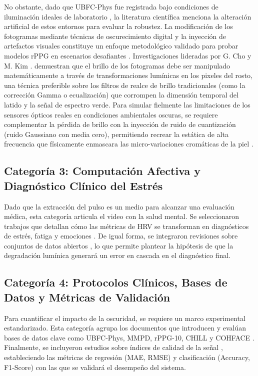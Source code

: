 No obstante, dado que UBFC-Phys fue registrada bajo condiciones de iluminación ideales de laboratorio \cite{debnath2026advanced_signal}, la literatura científica menciona la alteración 
artificial de estos entornos para evaluar la robustez. La modificación de los fotogramas mediante técnicas de oscurecimiento digital y la 
inyección de artefactos visuales constituye un enfoque metodológico validado para probar modelos rPPG en escenarios desafiantes \cite{kim2022study}. Investigaciones lideradas 
por G. Cho y M. Kim \cite{cho2025dualbranch}. demuestran que el brillo de los fotogramas debe ser manipulado matemáticamente a través de transformaciones 
lumínicas en los pixeles del rosto, una técnica preferible sobre los filtros de realce de brillo tradicionales (como la corrección Gamma o ecualización) que corrompen la 
dimensión temporal del latido y la señal de espectro verde. Para simular fielmente las limitaciones de los sensores ópticos reales en condiciones ambientales oscuras, se requiere 
complementar la pérdida de brillo con la inyección de ruido de cuantización (ruido Gaussiano con media cero), permitiendo recrear la estática de alta 
frecuencia que físicamente enmascara las micro-variaciones cromáticas de la piel \cite{debnath2026advanced_signal}.

\subsection{Categoría 3: Computación Afectiva y Diagnóstico Clínico del Estrés}
Dado que la extracción del pulso es un medio para alcanzar una evaluación médica, esta categoría articula el video con la salud mental. Se seleccionaron 
trabajos que detallan cómo las métricas de HRV se transforman en diagnósticos de estrés, fatiga y emociones 
\cite{fontes2024enhancing, mouadili2025advancing, morales2022towards, bahameish2024strategies, kakhi2025fatigue_wear, hsu2025basic_emotion}. De igual forma, 
se integraron revisiones sobre conjuntos de datos abiertos \cite{chatzaki2025overview, rodriguez2025datasets, odinaev2024robust}, lo que permite plantear la 
hipótesis de que la degradación lumínica generará un error en cascada en el diagnóstico final.

\subsection{Categoría 4: Protocolos Clínicos, Bases de Datos y Métricas de Validación}
Para cuantificar el impacto de la oscuridad, se requiere un marco experimental estandarizado. Esta categoría agrupa los documentos que introducen y evalúan 
bases de datos clave como UBFC-Phys, MMPD, rPPG-10, CHILL y COHFACE 
\cite{acharya2025reliability, sabour2023ubfcphys, rodrigues2025evaluating, benezeth2024video, nguyen2024artifact_resilience, yang2022assessment_dl}. 
Finalmente, se incluyeron estudios sobre índices de calidad de la señal \cite{ma2025rfbayes, debnath2026advanced_signal}, estableciendo las métricas de 
regresión (MAE, RMSE) y clasificación (Accuracy, F1-Score) con las que se validará el desempeño del sistema.

